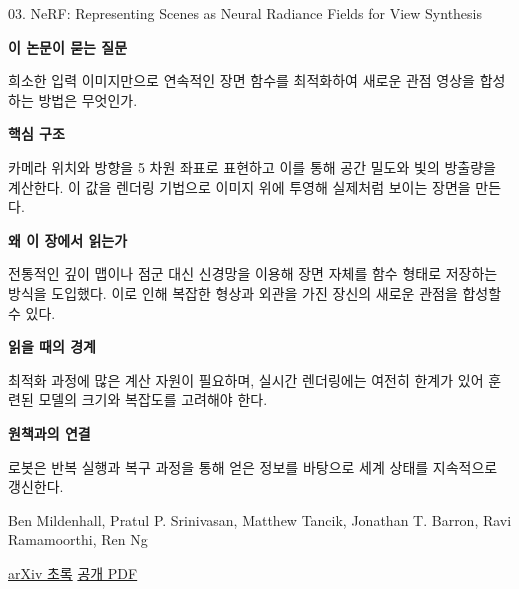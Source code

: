 \documentclass[11pt,openany]{book}
\begin{document}
\begin{termcard}{03. NeRF: Representing Scenes as Neural Radiance Fields for View Synthesis}

\par

\medskip

{\sffamily\bfseries\color{deepblue} 이 논문이 묻는 질문}\par

희소한 입력 이미지만으로 연속적인 장면 함수를 최적화하여 새로운 관점 영상을 합성하는 방법은 무엇인가.

\smallskip

{\sffamily\bfseries\color{deepblue} 핵심 구조}\par

카메라 위치와 방향을 5 차원 좌표로 표현하고 이를 통해 공간 밀도와 빛의 방출량을 계산한다. 이 값을 렌더링 기법으로 이미지 위에 투영해 실제처럼 보이는 장면을 만든다.

\smallskip

{\sffamily\bfseries\color{deepblue} 왜 이 장에서 읽는가}\par

전통적인 깊이 맵이나 점군 대신 신경망을 이용해 장면 자체를 함수 형태로 저장하는 방식을 도입했다. 이로 인해 복잡한 형상과 외관을 가진 장신의 새로운 관점을 합성할 수 있다.

\smallskip

{\sffamily\bfseries\color{coral} 읽을 때의 경계}\par

최적화 과정에 많은 계산 자원이 필요하며, 실시간 렌더링에는 여전히 한계가 있어 훈련된 모델의 크기와 복잡도를 고려해야 한다.

\smallskip

{\sffamily\bfseries\color{teal} 원책과의 연결}\par

로봇은 반복 실행과 복구 과정을 통해 얻은 정보를 바탕으로 세계 상태를 지속적으로 갱신한다.

\medskip

{\footnotesize\color{muted} Ben Mildenhall, Pratul P. Srinivasan, Matthew Tancik, Jonathan T. Barron, Ravi Ramamoorthi, Ren Ng\par

\href{https://arxiv.org/abs/2003.08934}{arXiv 초록} \quad \href{https://arxiv.org/pdf/2003.08934}{공개 PDF}\par}

\end{termcard}
\end{document}
